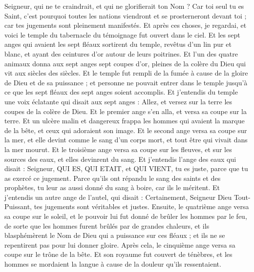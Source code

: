 \begin{multicols}{2}
Seigneur, qui ne te craindrait, et qui ne glorifierait ton Nom ? Car toi seul tu es Saint, c'est pourquoi toutes les nations viendront et se prosterneront devant toi ; car tes jugements sont pleinement manifestés.
Et après ces choses, je regardai, et voici le temple du tabernacle du témoignage fut ouvert dans le ciel.
Et les sept anges qui avaient les sept fléaux sortirent du temple, revêtus d'un lin pur et blanc, et ayant des ceintures d'or autour de leurs poitrines.
Et l'un des quatre animaux donna aux sept anges sept coupes d'or, pleines de la colère du Dieu qui vit aux siècles des siècles.
Et le temple fut rempli de la fumée à cause de la gloire de Dieu et de sa puissance ; et personne ne pouvait entrer dans le temple jusqu'à ce que les sept fléaux des sept anges soient accomplis.
\VerseOne{}Et j'entendis du temple une voix éclatante qui disait aux sept anges : Allez, et versez sur la terre les coupes de la colère de Dieu.
Et le premier ange s'en alla, et versa sa coupe sur la terre. Et un ulcère malin et dangereux frappa les hommes qui avaient la marque de la bête, et ceux qui adoraient son image.
Et le second ange versa sa coupe sur la mer, et elle devint comme le sang d'un corps mort, et tout être qui vivait dans la mer mourut.
Et le troisième ange versa sa coupe sur les fleuves, et sur les sources des eaux, et elles devinrent du sang.
Et j'entendis l'ange des eaux qui disait : Seigneur, QUI ES, QUI ETAIT, et QUI VIENT, tu es juste, parce que tu as exercé ce jugement.
Parce qu'ils ont répandu le sang des saints et des prophètes, tu leur as aussi donné du sang à boire, car ils le méritent.
Et j'entendis un autre ange de l'autel, qui disait : Certainement, Seigneur Dieu Tout-Puissant, tes jugements sont véritables et justes.
Ensuite, le quatrième ange versa sa coupe sur le soleil, et le pouvoir lui fut donné de brûler les hommes par le feu,
de sorte que les hommes furent brûlés par de grandes chaleurs, et ils blasphémèrent le Nom de Dieu qui a puissance sur ces fléaux ; et ils ne se repentirent pas pour lui donner gloire.
Après cela, le cinquième ange versa sa coupe sur le trône de la bête. Et son royaume fut couvert de ténèbres, et les hommes se mordaient la langue à cause de la douleur qu'ils ressentaient.

\end{multicols}
